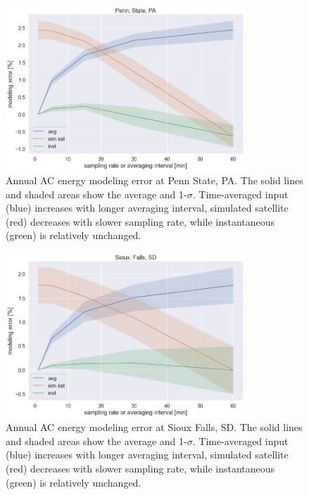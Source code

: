 \documentclass[conference]{IEEEtran}
\begin{document}
\begin{figure}[htbp]
\centerline{\includegraphics[width=9cm]{analysis/psu_all.png}}
\caption{Annual AC energy modeling error at Penn State, PA. The solid lines and shaded areas show the average and 1-$\sigma$. Time-averaged input (blue) increases with longer averaging interval, simulated satellite (red) decreases with slower sampling rate, while instantaneous (green) is relatively unchanged.}
\label{fig:psu2010}
\end{figure}

\begin{figure}[htbp]
\centerline{\includegraphics[width=9cm]{analysis/sxf_all.png}}
\caption{Annual AC energy modeling error at Sioux Falls, SD. The solid lines and shaded areas show the average and 1-$\sigma$. Time-averaged input (blue) increases with longer averaging interval, simulated satellite (red) decreases with slower sampling rate, while instantaneous (green) is relatively unchanged.}
\label{fig:sxf2009}
\end{figure}
\end{document}
